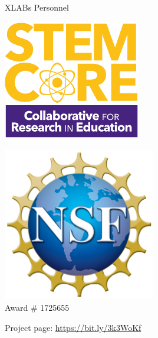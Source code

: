 \documentclass[xcolor=dvipsnames,table]{beamer}
\begin{document}
\begin{frame}{XLABs Personnel}
\begin{minipage}{0.48\textwidth}
\begin{center}
      \hfill\includegraphics[width=0.45\textwidth]{./logos/stemCoreLogoTall.pdf}
    \end{center}
  \end{minipage}

  
  \begin{minipage}{0.25\textwidth}
    \begin{center}\scriptsize
      \includegraphics[width=0.5\textwidth]{./logos/NSF_4-Color_bitmap_Logo.png}\\
      Award \# 1725655
    \end{center}
  \end{minipage}%
  \begin{minipage}{0.5\textwidth}\scriptsize
    \begin{block}{Project page:}
      \centering \url{https://bit.ly/3k3WoKf}
    \end{block}
  \end{minipage}
\end{frame}
\end{document}
